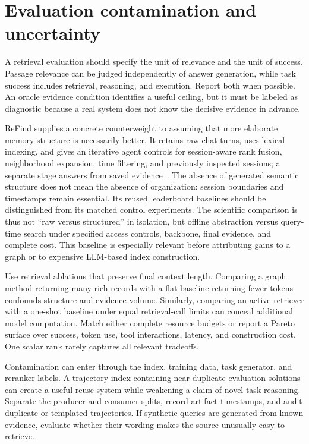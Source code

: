 \section{Evaluation contamination and uncertainty}\label{sec:C16:evaluation}
A retrieval evaluation should specify the unit of relevance and the unit of success. Passage relevance can be judged independently of answer generation, while task success includes retrieval, reasoning, and execution. Report both when possible. An oracle evidence condition identifies a useful ceiling, but it must be labeled as diagnostic because a real system does not know the decisive evidence in advance.

ReFind supplies a concrete counterweight to assuming that more elaborate memory structure is necessarily better. It retains raw chat turns, uses lexical indexing, and gives an iterative agent controls for session-aware rank fusion, neighborhood expansion, time filtering, and previously inspected sessions; a separate stage answers from saved evidence~\cite{cumb2026refindv2}. The absence of generated semantic structure does not mean the absence of organization: session boundaries and timestamps remain essential. Its reused leaderboard baselines should be distinguished from its matched control experiments. The scientific comparison is thus not ``raw versus structured'' in isolation, but offline abstraction versus query-time search under specified access controls, backbone, final evidence, and complete cost. This baseline is especially relevant before attributing gains to a graph or to expensive LLM-based index construction.

Use retrieval ablations that preserve final context length. Comparing a graph method returning many rich records with a flat baseline returning fewer tokens confounds structure and evidence volume. Similarly, comparing an active retriever with a one-shot baseline under equal retrieval-call limits can conceal additional model computation. Match either complete resource budgets or report a Pareto surface over success, token use, tool interactions, latency, and construction cost. One scalar rank rarely captures all relevant tradeoffs.

Contamination can enter through the index, training data, task generator, and reranker labels. A trajectory index containing near-duplicate evaluation solutions can create a useful reuse system while weakening a claim of novel-task reasoning. Separate the producer and consumer splits, record artifact timestamps, and audit duplicate or templated trajectories. If synthetic queries are generated from known evidence, evaluate whether their wording makes the source unusually easy to retrieve.

